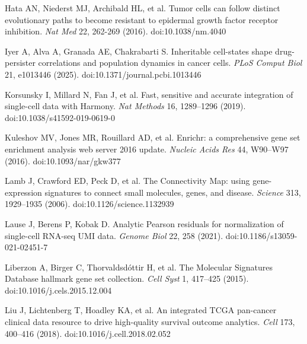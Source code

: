 \documentclass[11pt,a4paper]{article}
\begin{document}
\noindent Hata AN, Niederst MJ, Archibald HL, et al. Tumor cells can follow distinct evolutionary paths to become resistant to epidermal growth factor receptor inhibition. \emph{Nat Med} 22, 262-269 (2016). doi:10.1038/nm.4040 \par\vspace{2pt}

\noindent Iyer A, Alva A, Granada AE, Chakrabarti S. Inheritable cell-states shape drug-persister correlations and population dynamics in cancer cells. \emph{PLoS Comput Biol} 21, e1013446 (2025). doi:10.1371/journal.pcbi.1013446 \par\vspace{2pt}

\noindent Korsunsky I, Millard N, Fan J, et al. Fast, sensitive and accurate integration of single-cell data with Harmony. \emph{Nat Methods} 16, 1289--1296 (2019). doi:10.1038/s41592-019-0619-0\par\vspace{2pt}

\noindent Kuleshov MV, Jones MR, Rouillard AD, et al. Enrichr: a comprehensive gene set enrichment analysis web server 2016 update. \emph{Nucleic Acids Res} 44, W90--W97 (2016). doi:10.1093/nar/gkw377\par\vspace{2pt}

\noindent Lamb J, Crawford ED, Peck D, et al. The Connectivity Map: using gene-expression signatures to connect small molecules, genes, and disease. \emph{Science} 313, 1929--1935 (2006). doi:10.1126/science.1132939\par\vspace{2pt}

\noindent Lause J, Berens P, Kobak D. Analytic Pearson residuals for normalization of single-cell RNA-seq UMI data. \emph{Genome Biol} 22, 258 (2021). doi:10.1186/s13059-021-02451-7\par\vspace{2pt}

\noindent Liberzon A, Birger C, Thorvaldsd\'ottir H, et al. The Molecular Signatures Database hallmark gene set collection. \emph{Cell Syst} 1, 417--425 (2015). doi:10.1016/j.cels.2015.12.004\par\vspace{2pt}

\noindent Liu J, Lichtenberg T, Hoadley KA, et al. An integrated TCGA pan-cancer clinical data resource to drive high-quality survival outcome analytics. \emph{Cell} 173, 400--416 (2018). doi:10.1016/j.cell.2018.02.052\par\vspace{2pt}
\end{document}
